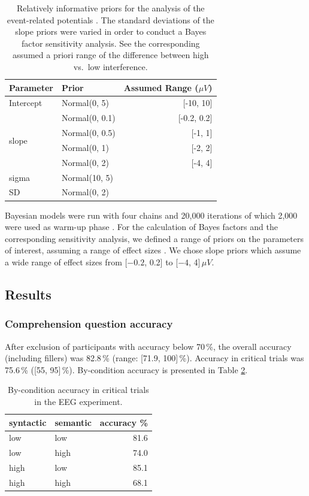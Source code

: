 \documentclass[review,preprint,12pt,authoryear,floatsintext]{elsarticle}
\begin{document}
\begin{table}[!htbp]
    \caption{Relatively informative priors for the analysis of the event-related potentials \citep{nicenboim_stats}. The standard deviations of the slope priors were varied in order to conduct a Bayes factor sensitivity analysis. See the corresponding assumed a priori range of the difference between high vs.\ low interference.}
    \label{tab:eeg_priors}
    \centering
    \begin{tabular}{llr}
    \toprule
    Parameter&Prior &Assumed Range ($\mu V$)\\
    \midrule
  Intercept & Normal(0, 5)& [-10, 10]\\
  \cmidrule{2-3}
  \multirow{4}{1cm}{slope} & Normal(0, 0.1) & [-0.2, 0.2]\\
  & Normal(0, 0.5)& [-1, 1]\\
  & Normal(0, 1) & [-2, 2]\\
  & Normal(0, 2) & [-4, 4]\\
  \cmidrule{2-3}
  sigma & Normal(10, 5)&\\
  SD & Normal(0, 2)&\\
    \bottomrule
    \end{tabular}
\end{table}

Bayesian models were run with four chains and 20,000 iterations of which 2,000 were used as warm-up phase \citep{schad_etal_2022_BF}. For the calculation of Bayes factors and the corresponding sensitivity analysis, we defined a range of priors on the parameters of interest, assuming a range of effect sizes \citep{nicenboim_stats,schad_etal_2022_BF}. We chose slope priors which assume a wide range of effect sizes from [$-0.2$, 0.2] to [$-4$, 4]\,$\mu V$. 

\subsection{Results}
\subsubsection{Comprehension question accuracy}
After exclusion of participants with accuracy below 70\,\%, the overall accuracy (including fillers) was 82.8\,\% (range: [71.9, 100]\,\%). Accuracy in critical trials was 75.6\,\% ([55, 95]\,\%). By-condition accuracy is presented in Table \ref{tab:eeg_acc}. 

\begin{table}[ht]
    \caption{By-condition accuracy in critical trials in the EEG experiment.}
    \label{tab:eeg_acc}
    \centering
    \begin{tabular}{llr}
    \toprule
    syntactic & semantic & accuracy \%\\
    \midrule
        low &  low & 81.6\\
        low &  high & 74.0\\
        high &  low & 85.1\\
        high &  high & 68.1\\
    \bottomrule
    \end{tabular}
\end{table}
\end{document}
